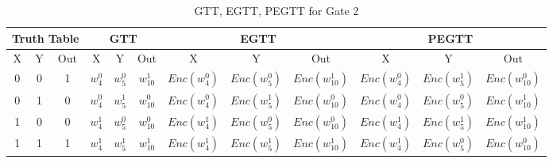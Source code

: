 \documentclass[times]{article}
\begin{document}
	\begin{table}
		\centering
		\caption{GTT, EGTT, PEGTT for Gate 2}
		\label{tab:gtt2}
		\begin{adjustbox}{width=1\textwidth}
		\begin{tabular}{|c|c|c||c|c|c||c|c|c||c|c|c|}
			\hline
			\multicolumn{3}{|c||}{Truth Table} 		& 
				\multicolumn{3}{|c||}{GTT}			& 
					\multicolumn{3}{|c||}{EGTT} 		& 
						\multicolumn{3}{|c|}{PEGTT} \\
			\hline
			\hline
			X & Y & Out	& 
				X & Y & Out	& 
					X & Y & Out	& 
						X & Y & Out	\\
			\hline
			0 & 0 & 1 	&
				$w_{4}^0$	& $w_{5}^0$	& $w_{10}^1$	& 
					$Enc(w_{4}^0)$	& $Enc(w_{5}^0)$	& $Enc(w_{10}^1)$ &
						$Enc(w_{4}^0)$	& $Enc(w_{5}^1)$	& $Enc(w_{10}^0)$ \\
			\hline
			0 & 1 & 0 	&
				$w_{4}^0$	& $w_{5}^1$	& $w_{10}^0$	& 
					$Enc(w_{4}^0)$	& $Enc(w_{5}^1)$	& $Enc(w_{10}^0)$ &
						$Enc(w_{4}^0)$	& $Enc(w_{5}^0)$	& $Enc(w_{10}^1)$ \\
			\hline
			1 & 0 & 0 	&
				$w_{4}^1$	& $w_{5}^0$	& $w_{10}^0$	& 
					$Enc(w_{4}^1)$	& $Enc(w_{5}^0)$	& $Enc(w_{10}^0)$ &
						$Enc(w_{4}^1)$	& $Enc(w_{5}^1)$	& $Enc(w_{10}^1)$ \\
			\hline
			1 & 1 & 1 	&
				$w_{4}^1$	& $w_{5}^1$	& $w_{10}^1$	& 
					$Enc(w_{4}^1)$	& $Enc(w_{5}^1)$	& $Enc(w_{10}^1)$ &
						$Enc(w_{4}^1)$	& $Enc(w_{5}^0)$	& $Enc(w_{10}^0)$ \\
			\hline
		\end{tabular}
		\end{adjustbox}
	\end{table}
\end{document}
